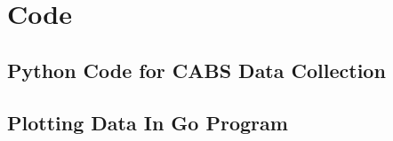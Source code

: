 \chapter{Code}
\label{appendix: Code}
\acresetall

\section{Python Code for CABS Data Collection}

%

\clearpage

\section{Plotting Data In Go Program}

%
